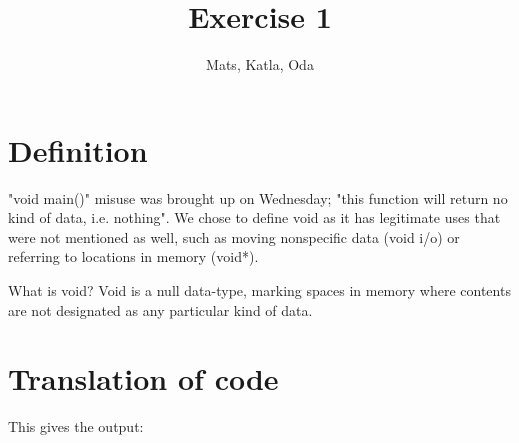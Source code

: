 \documentclass{article}
\title{Exercise 1}
\author{Mats, Katla, Oda}
\begin{document}
\maketitle

\section{Definition}

"void main()" misuse was brought up on Wednesday; "this function will return no kind of data, i.e. nothing". We chose to define void as it has legitimate uses that were not mentioned as well, such as moving nonspecific data (void i/o) or referring to locations in memory (void*).

What is void? Void is a null data-type, marking spaces in memory where contents are not designated as any particular kind of data.

\section{Translation of code}



This gives the output:


\end{document}
